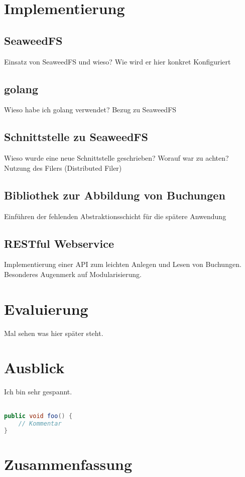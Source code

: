 \documentclass[12pt,oneside,a4paper,parskip]{scrbook}
\begin{document}
\chapter{Implementierung}
\section{SeaweedFS}
Einsatz von SeaweedFS und wieso?
Wie wird er hier konkret Konfiguriert
\section{golang}
Wieso habe ich golang verwendet? Bezug zu SeaweedFS 
\section{Schnittstelle zu SeaweedFS}
Wieso wurde eine neue Schnittstelle geschrieben?
Worauf war zu achten? Nutzung des Filers (Distributed Filer)
\section{Bibliothek zur Abbildung von Buchungen}
Einführen der fehlenden Abstraktionsschicht für die spätere Anwendung
\section{RESTful Webservice}
Implementierung einer API zum leichten Anlegen und Lesen von Buchungen. Besonderes Augenmerk auf Modularisierung.

\chapter{Evaluierung}
Mal sehen was hier später steht.

\chapter{Ausblick}
Ich bin sehr gespannt.

\begin{lstlisting}[label=lst:java,
				   language=java,
				   firstnumber=1,
				   caption=Beispiel für einen Quelltext]				   

public void foo() {				   
	// Kommentar
}
\end{lstlisting}

\chapter{Zusammenfassung}
\end{document}
